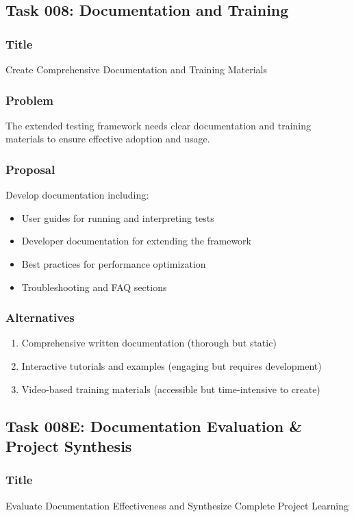 \documentclass[11pt,a4paper]{article}
\begin{document}
\subsection{Task 008: Documentation and Training}

\subsubsection{Title}
Create Comprehensive Documentation and Training Materials

\subsubsection{Problem}
The extended testing framework needs clear documentation and training materials to ensure effective adoption and usage.

\subsubsection{Proposal}
Develop documentation including:
\begin{itemize}
    \item User guides for running and interpreting tests
    \item Developer documentation for extending the framework
    \item Best practices for performance optimization
    \item Troubleshooting and FAQ sections
\end{itemize}

\subsubsection{Alternatives}
\begin{enumerate}
    \item Comprehensive written documentation (thorough but static)
    \item Interactive tutorials and examples (engaging but requires development)
    \item Video-based training materials (accessible but time-intensive to create)
\end{enumerate}

\subsection{Task 008E: Documentation Evaluation \& Project Synthesis}

\subsubsection{Title}
Evaluate Documentation Effectiveness and Synthesize Complete Project Learning
\end{document}
